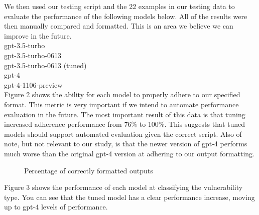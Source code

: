 \documentclass[acmsmall]{acmart}
\begin{document}
We then used our testing script and the 22 examples in our testing data to evaluate the performance of the following models below. All of the results were then manually compared and formatted. This is an area we believe we can improve in the future.
\newline
\\gpt-3.5-turbo
\\gpt-3.5-turbo-0613
\\gpt-3.5-turbo-0613 (tuned)
\\gpt-4
\\gpt-4-1106-preview\\



Figure 2 shows the ability for each model to properly adhere to our specified format. This metric is very important if we intend to automate performance evaluation in the future. The most important result of this data is that tuning increased adherence performance from 76\% to 100\%. This suggests that tuned models should support automated evaluation given the correct script.
Also of note, but not relevant to our study, is that the newer version of gpt-4 performs much worse than the original gpt-4 version at adhering to our output formatting.\\

\begin{figure}[htp] 
\caption{Percentage of correctly formatted outputs}
\end{figure}

Figure 3 shows the performance of each model at classifying the vulnerability type. You can see that the tuned model has a clear performance increase, moving up to gpt-4 levels of performance.\\
\end{document}
